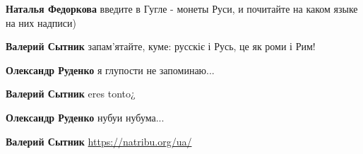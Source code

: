 \begin{itemize}
\begin{itemize}
\begin{itemize}
 
\textbf{Наталья Федоркова} введите в Гугле - монеты Руси, и почитайте на каком языке на них надписи)

 
\textbf{Валерий Сытник} запам'ятайте, куме:
русскіє і Русь, це як роми і Рим!\Laughey[1.0][white]

 
\textbf{Олександр Руденко} я глупости не запоминаю...

 
\textbf{Валерий Сытник} eres tonto¿

 
\textbf{Олександр Руденко} нубуи нубума...

 
\textbf{Валерий Сытник} \url{https://natribu.org/ua/}


\end{itemize}

 

\end{itemize}
\end{itemize}
